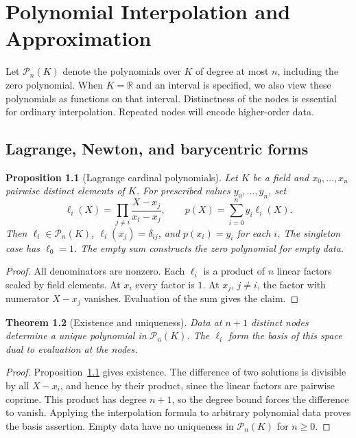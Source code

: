 \documentclass[11pt,oneside,openany]{book}
\theoremstyle{plain}
\newtheorem{theorem}{Theorem}[chapter]
\newtheorem{proposition}[theorem]{Proposition}
\theoremstyle{definition}
\theoremstyle{remark}
\begin{document}
\chapter{Polynomial Interpolation and Approximation}
\label{p206:ch06}

Let \(\mathcal P_n(K)\) denote the polynomials over \(K\) of degree at
most \(n\), including the zero polynomial. When \(K=\mathbb R\) and an
interval is specified, we also view these polynomials as functions on
that interval. Distinctness of the nodes is essential for ordinary
interpolation. Repeated nodes will encode higher-order data.

\section{Lagrange, Newton, and barycentric forms}

\begin{proposition}[Lagrange cardinal polynomials]\label{p206:W46}
Let \(K\) be a field and \(x_0,\ldots,x_n\) pairwise distinct elements
of \(K\). For prescribed values \(y_0,\ldots,y_n\), set
\[
 \ell_i(X)=\prod_{j\ne i}\frac{X-x_j}{x_i-x_j},
 \qquad
 p(X)=\sum_{i=0}^n y_i\ell_i(X).
\]
Then \(\ell_i\in\mathcal P_n(K)\), \(\ell_i(x_j)=\delta_{ij}\), and
\(p(x_i)=y_i\) for each \(i\). The singleton case has
\(\ell_0=1\). The empty sum constructs the zero polynomial for empty
data.
\end{proposition}

\begin{proof}
All denominators are nonzero. Each \(\ell_i\) is a product of \(n\)
linear factors scaled by field elements. At \(x_i\) every factor is
\(1\). At \(x_j\), \(j\ne i\), the factor with numerator \(X-x_j\)
vanishes. Evaluation of the sum gives the claim.
\end{proof}

\begin{theorem}[Existence and uniqueness]\label{p206:W47}
Data at \(n+1\) distinct nodes determine a unique polynomial in
\(\mathcal P_n(K)\). The \(\ell_i\) form the basis of this space dual
to evaluation at the nodes.
\end{theorem}

\begin{proof}
Proposition~\ref{p206:W46} gives existence. The difference of two
solutions is divisible by all \(X-x_i\), and hence by their product,
since the linear factors are pairwise coprime. This product has
degree \(n+1\), so the degree bound forces the difference to vanish.
Applying the interpolation formula to arbitrary polynomial data
proves the basis assertion. Empty data have no uniqueness in
\(\mathcal P_n(K)\) for \(n\ge0\).
\end{proof}
\end{document}
